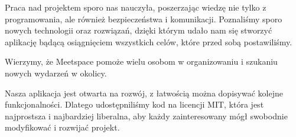 	Praca nad projektem sporo nas nauczyła, poszerzając wiedzę nie tylko z programowania, ale również bezpieczeństwa i komunikacji. Poznaliśmy sporo nowych technologii oraz rozwiązań, dzięki którym udało nam się stworzyć aplikację bądącą osiągnięciem wszystkich celów, które przed sobą postawiliśmy.

	Wierzymy, że Meetspace pomoże wielu osobom w organizowaniu i szukaniu nowych wydarzeń w okolicy.

	Nasza aplikacja jest otwarta na rozwój, z łatwością można dopisywać kolejne funkcjonalności. Dlatego udostępniliśmy kod na licencji MIT, która jest najprostsza i najbardziej liberalna, aby każdy zainteresowany mógł swobodnie modyfikować i rozwijać projekt.
